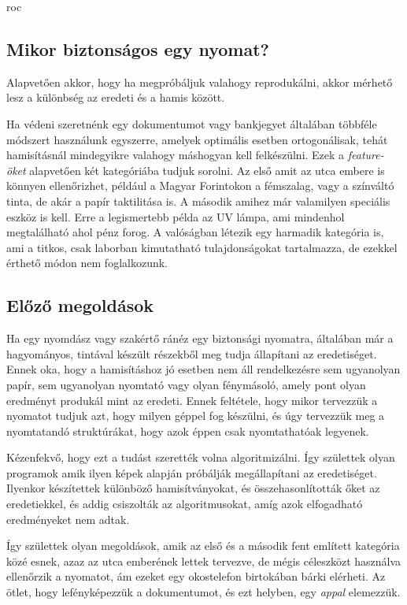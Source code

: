 roc


\subsection{Mikor biztonságos egy nyomat?}

Alapvetően akkor, hogy ha megpróbáljuk valahogy reprodukálni, akkor
mérhető lesz a különbség az eredeti és a hamis között.

Ha védeni szeretnénk egy dokumentumot vagy bankjegyet általában 
többféle módszert használunk egyszerre, amelyek optimális esetben 
ortogonálisak, tehát hamisításnál mindegyikre valahogy máshogyan kell 
felkészülni. Ezek a \textit{feature-öket} alapvetően két kategóriába tudjuk sorolni. 
Az első amit az utca embere is könnyen ellenőrizhet, például a Magyar Forintokon 
a fémszalag, vagy a színváltó tinta, de akár a papír taktilitása is.
A második amihez már valamilyen speciális eszköz is kell. Erre a legismertebb 
példa az UV lámpa, ami mindenhol megtalálható ahol pénz forog.
A valóságban létezik egy harmadik kategória is, ami a titkos, csak 
laborban kimutatható tulajdonságokat tartalmazza, de ezekkel érthető
módon nem foglalkozunk.


\subsection{Előző megoldások}

Ha egy nyomdász vagy szakértő ránéz egy biztonsági nyomatra, 
általában már a hagyományos, tintával készült részekből meg tudja
állapítani az eredetiséget. Ennek oka, hogy a hamisításhoz jó esetben nem áll 
rendelkezésre sem ugyanolyan papír, sem ugyanolyan nyomtató vagy olyan fénymásoló,
amely pont olyan eredményt produkál mint az eredeti.
Ennek feltétele, hogy mikor tervezzük a nyomatot tudjuk azt, hogy
milyen géppel fog készülni, és úgy tervezzük meg a nyomtatandó struktúrákat,
hogy azok éppen csak nyomtathatóak legyenek.


Kézenfekvő, hogy ezt a tudást szerették volna algoritmizálni. Így születtek olyan
programok amik ilyen képek alapján próbálják megállapítani az eredetiséget. 
Ilyenkor készítettek különböző hamisítványokat, és összehasonlították őket az eredetiekkel,
és addig csiszolták az algoritmusokat, amíg azok elfogadható eredményeket nem adtak.


Így születtek olyan megoldások, amik az első és a második fent említett kategória 
közé esnek, azaz az utca emberének lettek tervezve, de mégis céleszközt használva
ellenőrzik a nyomatot, ám ezeket egy okostelefon birtokában bárki elérheti.
Az ötlet, hogy lefényképezzük a dokumentumot, és ezt helyben, egy \textit{appal} elemezzük.



